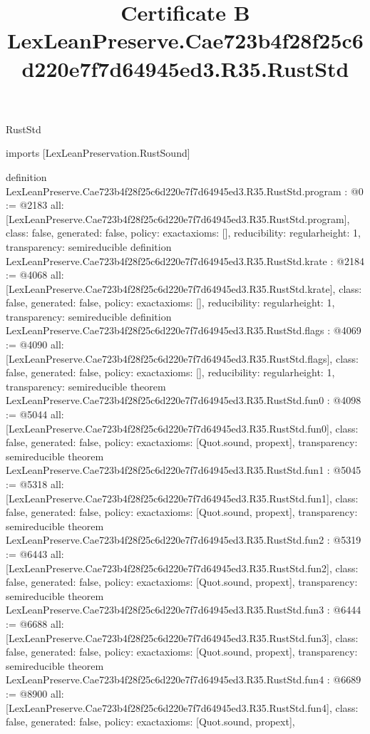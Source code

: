 \begin{lexlean}{RustStd}
\title{Certificate B LexLeanPreserve.Cae723b4f28f25c6d220e7f7d64945ed3.R35.RustStd}
\begin{coremodule}
imports [LexLeanPreservation.RustSound]

definition LexLeanPreserve.Cae723b4f28f25c6d220e7f7d64945ed3.R35.RustStd.program : @0 := @2183 {
  all: [LexLeanPreserve.Cae723b4f28f25c6d220e7f7d64945ed3.R35.RustStd.program],
  class: false,
  generated: false,
  policy: exact{axioms: []},
  reducibility: regular{height: 1},
  transparency: semireducible
}
definition LexLeanPreserve.Cae723b4f28f25c6d220e7f7d64945ed3.R35.RustStd.krate : @2184 := @4068 {
  all: [LexLeanPreserve.Cae723b4f28f25c6d220e7f7d64945ed3.R35.RustStd.krate],
  class: false,
  generated: false,
  policy: exact{axioms: []},
  reducibility: regular{height: 1},
  transparency: semireducible
}
definition LexLeanPreserve.Cae723b4f28f25c6d220e7f7d64945ed3.R35.RustStd.flags : @4069 := @4090 {
  all: [LexLeanPreserve.Cae723b4f28f25c6d220e7f7d64945ed3.R35.RustStd.flags],
  class: false,
  generated: false,
  policy: exact{axioms: []},
  reducibility: regular{height: 1},
  transparency: semireducible
}
theorem LexLeanPreserve.Cae723b4f28f25c6d220e7f7d64945ed3.R35.RustStd.fun0 : @4098 := @5044 {
  all: [LexLeanPreserve.Cae723b4f28f25c6d220e7f7d64945ed3.R35.RustStd.fun0],
  class: false,
  generated: false,
  policy: exact{axioms: [Quot.sound, propext]},
  transparency: semireducible
}
theorem LexLeanPreserve.Cae723b4f28f25c6d220e7f7d64945ed3.R35.RustStd.fun1 : @5045 := @5318 {
  all: [LexLeanPreserve.Cae723b4f28f25c6d220e7f7d64945ed3.R35.RustStd.fun1],
  class: false,
  generated: false,
  policy: exact{axioms: [Quot.sound, propext]},
  transparency: semireducible
}
theorem LexLeanPreserve.Cae723b4f28f25c6d220e7f7d64945ed3.R35.RustStd.fun2 : @5319 := @6443 {
  all: [LexLeanPreserve.Cae723b4f28f25c6d220e7f7d64945ed3.R35.RustStd.fun2],
  class: false,
  generated: false,
  policy: exact{axioms: [Quot.sound, propext]},
  transparency: semireducible
}
theorem LexLeanPreserve.Cae723b4f28f25c6d220e7f7d64945ed3.R35.RustStd.fun3 : @6444 := @6688 {
  all: [LexLeanPreserve.Cae723b4f28f25c6d220e7f7d64945ed3.R35.RustStd.fun3],
  class: false,
  generated: false,
  policy: exact{axioms: [Quot.sound, propext]},
  transparency: semireducible
}
theorem LexLeanPreserve.Cae723b4f28f25c6d220e7f7d64945ed3.R35.RustStd.fun4 : @6689 := @8900 {
  all: [LexLeanPreserve.Cae723b4f28f25c6d220e7f7d64945ed3.R35.RustStd.fun4],
  class: false,
  generated: false,
  policy: exact{axioms: [Quot.sound, propext]},
}
\end{coremodule}
\end{lexlean}
